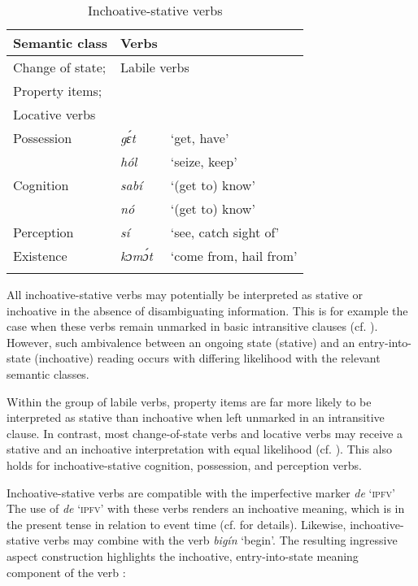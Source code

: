 \begin{table}
\caption{Inchoative-stative verbs}
\label{tab:key:6.2}

\begin{tabularx}{.8\textwidth}{Xll}
\lsptoprule
Semantic class & Verbs & \\
\midrule
Change of state; & \multicolumn{2}{l}{Labile verbs}\\
Property items; & \\
Locative verbs & \\

\tablevspace
Possession & \itshape gɛ́t & ‘get, have’\\
& \itshape hól & ‘seize, keep’\\

\tablevspace
Cognition & \itshape sabí & ‘(get to) know’\\
& \itshape nó & ‘(get to) know’\\

\tablevspace
Perception & \itshape sí & ‘see, catch sight of’\\

\tablevspace
Existence & \itshape kɔmɔ́t & ‘come from, hail from’\\
\lspbottomrule
\end{tabularx}
\end{table}

All inchoative-stative verbs may potentially be interpreted as stative or inchoative in the absence of disambiguating information. This is for example the case when these verbs remain unmarked in basic intransitive clauses (cf. ). However, such ambivalence between an ongoing state (stative) and an entry-into-state (inchoative) reading occurs with differing likelihood with the relevant semantic classes. 


Within the group of labile verbs, property items are far more likely to be interpreted as stative than inchoative when left unmarked in an intransitive clause. In contrast, most change-of-state verbs and locative verbs may receive a stative and an inchoative interpretation with equal likelihood (cf. ). This also holds for inchoative-stative cognition, possession, and perception verbs. 



Inchoative-stative verbs are compatible with the imperfective marker \textit{de} ‘\textsc{ipfv’}  The use of \textit{de} ‘\textsc{ipfv’} with these verbs renders an inchoative meaning, which is in the present tense in relation to event time (cf.  for details). Likewise, inchoative-stative verbs may combine with the verb \textit{bigín} ‘begin’. The resulting ingressive aspect construction highlights the inchoative, entry-into-state meaning component of the verb :



